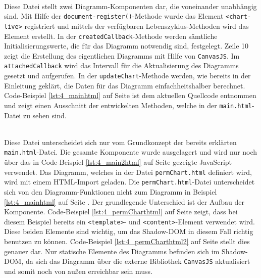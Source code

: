 \begin{enumerate}
 \hfill \\
Diese Datei stellt zwei Diagramm-Komponenten dar, die voneinander unabhängig sind. Mit Hilfe der \lstinline|document-register()|-Methode wurde das Element \lstinline|<chart-live>| registriert und mittels der verfügbaren Lebenszyklus-Methoden wird das Element erstellt. In der \lstinline|createdCallback|-Methode werden sämtliche Initialisierungswerte, die für das Diagramm notwendig sind, festgelegt. Zeile 10 zeigt die Erstellung des eigentlichen Diagramms mit Hilfe von \lstinline|CanvasJS|. Im \lstinline|attachedCallback| wird das Intervall für die Aktualisierung des Diagramms gesetzt und aufgerufen. In der \lstinline|updateChart|-Methode werden, wie bereits in der Einleitung geklärt, die Daten für das Diagramm einfachheitshalber berechnet. Code-Beispiel \ref{lst:4_mainhtml} auf Seite \pageref{lst:4_mainhtml} ist dem aktuellen Quellcode entnommen und zeigt einen Ausschnitt der entwickelten Methoden, welche in der \lstinline|main.html|-Datei zu sehen sind.



 \hfill \\
Diese Datei unterscheidet sich nur vom Grundkonzept der bereits erklärten \lstinline|main.html|-Datei. Die gesamte Komponente wurde ausgelagert und wird nur noch über das in Code-Beispiel \ref{lst:4_main2html} auf Seite \pageref{lst:4_main2html} gezeigte JavaScript verwendet. Das Diagramm, welches in der Datei \lstinline|permChart.html| definiert wird, wird mit einem HTML-Import geladen. Die \lstinline|permChart.html|-Datei unterscheidet sich von den Diagramm-Funktionen nicht zum Diagramm in Beispiel \ref{lst:4_mainhtml} auf Seite \pageref{lst:4_mainhtml}.
Der grundlegende Unterschied ist der Aufbau der Komponente. Code-Beispiel \ref{lst:4_permCharthtml} auf Seite \pageref{lst:4_permCharthtml} zeigt, dass bei diesem Beispiel bereits ein \lstinline|<template>|- und \lstinline|<content>|-Element verwendet wird. Diese beiden Elemente sind wichtig, um das Shadow-DOM in diesem Fall richtig benutzen zu können. Code-Beispiel \ref{lst:4_permCharthtml2} auf Seite \pageref{lst:4_permCharthtml2} stellt dies genauer dar. Nur statische Elemente des Diagramms befinden sich im Shadow-DOM, da sich das Diagramm über die externe Bibliothek \lstinline|CanvasJS| aktualisiert und somit noch von außen erreichbar sein muss.


\end{enumerate}
